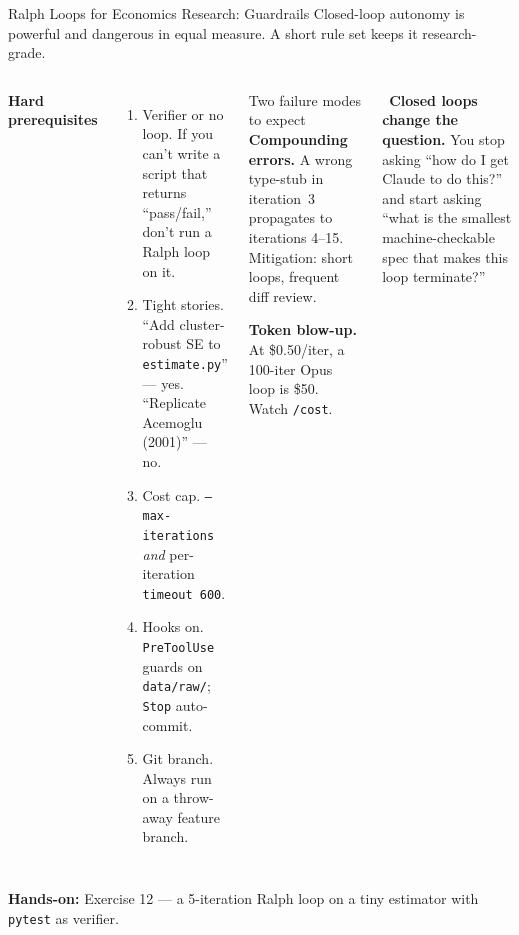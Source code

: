\documentclass[aspectratio=169,10pt]{beamer}
\newcommand{\emphc}[1]{\textcolor{harvardcrimson}{#1}}
\newcommand{\boristip}[1]{%
  \tikz[baseline=(X.base)]{\node[fill=level4,text=white,
  rounded corners=2pt,inner sep=2pt,font=\tiny\bfseries](X){TIP #1};}}
\begin{document}
\begin{frame}{Ralph Loops for Economics Research: Guardrails}
\scriptsize
Closed-loop autonomy is powerful and dangerous in equal measure. A short rule
set keeps it research-grade.

\vspace{0.3em}
\begin{columns}[T]
\textbf{Hard prerequisites}
\begin{enumerate}\itemsep0pt
  \item \emphc{Verifier or no loop.} If you can't write a script that returns
        ``pass/fail,'' don't run a Ralph loop on it.
  \item \emphc{Tight stories.} ``Add cluster-robust SE to \texttt{estimate.py}''
        --- yes. ``Replicate Acemoglu (2001)'' --- no.
  \item \emphc{Cost cap.} \texttt{--max-iterations} \emph{and} per-iteration
        \texttt{timeout 600}.
  \item \emphc{Hooks on.} \texttt{PreToolUse} guards on \texttt{data/raw/};
        \texttt{Stop} auto-commit.
  \item \emphc{Git branch.} Always run on a throw-away feature branch.
\end{enumerate}

\begin{alertblock}{Two failure modes to expect}
\tiny
\textbf{Compounding errors.} A wrong type-stub in iteration~3 propagates to
iterations 4--15. Mitigation: short loops, frequent diff review.

\vspace{0.3em}
\textbf{Token blow-up.} At \$0.50/iter, a 100-iter Opus loop is \$50.
Watch \texttt{/cost}.
\end{alertblock}

\vspace{0.2em}
\boristip{10}~\textbf{Closed loops change the question.} You stop asking
``how do I get Claude to do this?'' and start asking ``what is the smallest
machine-checkable spec that makes this loop terminate?''
\end{columns}

\vspace{0.2em}
\textbf{Hands-on:} \emphc{Exercise 12} --- a 5-iteration Ralph loop on a tiny estimator with \texttt{pytest} as verifier.
\end{frame}

\end{document}
